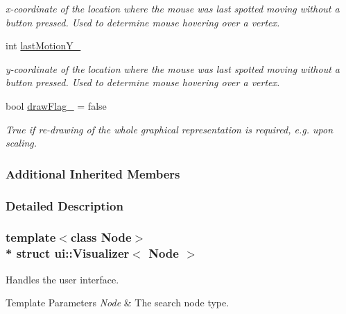 \begin{DoxyCompactItemize}
\begin{DoxyCompactList}\small\item\em x-\/coordinate of the location where the mouse was last spotted moving without a button pressed. Used to determine mouse hovering over a vertex. \end{DoxyCompactList}\item 
int \hyperlink{structui_1_1Visualizer_aca616e137d4e0e8efb4701ceb93c92ba}{last\+Motion\+Y\+\_\+}\hypertarget{structui_1_1Visualizer_aca616e137d4e0e8efb4701ceb93c92ba}{}\label{structui_1_1Visualizer_aca616e137d4e0e8efb4701ceb93c92ba}

\begin{DoxyCompactList}\small\item\em y-\/coordinate of the location where the mouse was last spotted moving without a button pressed. Used to determine mouse hovering over a vertex. \end{DoxyCompactList}\item 
bool \hyperlink{structui_1_1Visualizer_afdc980920587a8f6861a3b081b1b90c6}{draw\+Flag\+\_\+} = false\hypertarget{structui_1_1Visualizer_afdc980920587a8f6861a3b081b1b90c6}{}\label{structui_1_1Visualizer_afdc980920587a8f6861a3b081b1b90c6}

\begin{DoxyCompactList}\small\item\em {\ttfamily True} if re-\/drawing of the whole graphical representation is required, e.\+g. upon scaling. \end{DoxyCompactList}\end{DoxyCompactItemize}
\subsubsection*{Additional Inherited Members}


\subsubsection{Detailed Description}
\subsubsection*{template$<$class Node$>$\\*
struct ui\+::\+Visualizer$<$ Node $>$}

Handles the user interface. 


\begin{DoxyTemplParams}{Template Parameters}
{\em Node} & The search node type. \\
\hline
\end{DoxyTemplParams}



